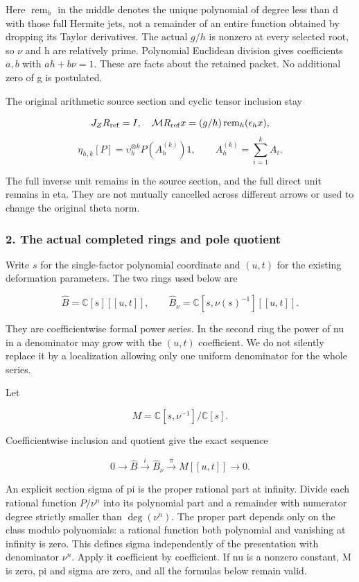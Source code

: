 \documentclass{article}
\begin{document}
Here \(\operatorname{rem}_h\) in the middle denotes the unique polynomial of degree less than d with those full Hermite jets, not a remainder of an entire function obtained by dropping its Taylor derivatives. The actual \(g/h\) is nonzero at every selected root, so \(\nu\) and h are relatively prime. Polynomial Euclidean division gives coefficients \(a,b\) with \(a h+b\nu=1\). These are facts about the retained packet. No additional zero of g is postulated.

The original arithmetic source section and cyclic tensor inclusion stay

\[
J_ZR_{\rm ref}=I,\quad
\mathcal M R_{\rm ref}x=(g/h)\operatorname{rem}_h(\epsilon_hx),
\] \[
\eta_{h,k}[P]=\upsilon_h^{\otimes k}
 P(A_h^{(k)})1,\qquad A_h^{(k)}=\sum_{i=1}^k A_i.
\tag{UG3}
\]

The full inverse unit remains in the source section, and the full direct unit remains in eta. They are not mutually cancelled across different arrows or used to change the original theta norm.

\subsubsection{2. The actual completed rings and pole quotient}\label{endpoint-f1_unit_gauge--the-actual-completed-rings-and-pole-quotient}

Write \(s\) for the single-factor polynomial coordinate and \((u,t)\) for the existing deformation parameters. The two rings used below are

\[
\widehat B=\mathbb C[s][[u,t]],\qquad
\widehat B_\nu=\mathbb C[s,\nu(s)^{-1}][[u,t]].
\tag{UG4}
\]

They are coefficientwise formal power series. In the second ring the power of nu in a denominator may grow with the \((u,t)\) coefficient. We do not silently replace it by a localization allowing only one uniform denominator for the whole series.

Let

\[
M=\mathbb C[s,\nu^{-1}]/\mathbb C[s].
\]

Coefficientwise inclusion and quotient give the exact sequence

\[
0\longrightarrow\widehat B\xrightarrow{i}\widehat B_\nu
 \xrightarrow{\pi} M[[u,t]]\longrightarrow0.
\tag{UG5}
\]

An explicit section sigma of pi is the proper rational part at infinity. Divide each rational function \(P/\nu^n\) into its polynomial part and a remainder with numerator degree strictly smaller than \(\deg(\nu^n)\). The proper part depends only on the class modulo polynomials: a rational function both polynomial and vanishing at infinity is zero. This defines sigma independently of the presentation with denominator \(\nu^n\). Apply it coefficient by coefficient. If nu is a nonzero constant, M is zero, pi and sigma are zero, and all the formulas below remain valid.
\end{document}
